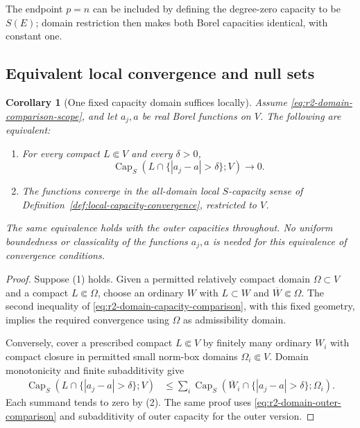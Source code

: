 \documentclass[11pt,a4paper]{article}
\numberwithin{equation}{section}
\newtheorem{corollary}[theorem]{Corollary}
\theoremstyle{definition}
\theoremstyle{remark}
\begin{document}
The endpoint $p=n$ can be included by defining the degree-zero
capacity to be $S(E)$; domain restriction then makes both Borel
capacities identical, with constant one.

\subsection{Equivalent local convergence and null sets}

\begin{corollary}[One fixed capacity domain suffices locally]
\label{cor:r2-fixed-domain-local-convergence}
Assume \eqref{eq:r2-domain-comparison-scope}, and let $a_j,a$ be
real Borel functions on $V$. The following are equivalent:
\begin{enumerate}
\item For every compact $L\Subset V$ and every $\delta>0$,
\[
 \operatorname{Cap}_S(L\cap\{|a_j-a|>\delta\};V)
                          \longrightarrow0.
\]
\item The functions converge in the all-domain local $S$-capacity
      sense of Definition~\ref{def:local-capacity-convergence},
      restricted to $V$.
\end{enumerate}
The same equivalence holds with the outer capacities throughout.
No uniform boundedness or classicality of the functions $a_j,a$ is
needed for this equivalence of convergence conditions.
\end{corollary}

\begin{proof}
Suppose (1) holds. Given a permitted relatively compact domain
$\Omega\subset V$ and a compact $L\Subset\Omega$, choose an
ordinary $W$ with $L\subset W$ and $\overline W\Subset\Omega$.
The second inequality of
\eqref{eq:r2-domain-capacity-comparison}, with this fixed geometry,
implies the required convergence using $\Omega$ as admissibility
domain.

Conversely, cover a prescribed compact $L\Subset V$ by finitely many
ordinary $W_i$ with compact closure in permitted small norm-box
domains $\Omega_i\Subset V$. Domain monotonicity and finite
subadditivity give
\[
 \begin{split}
 \operatorname{Cap}_S(L\cap\{|a_j-a|>\delta\};V)
 &\leq\sum_i\operatorname{Cap}_S
       (\overline W_i\cap\{|a_j-a|>\delta\};\Omega_i).
 \end{split}
\]
Each summand tends to zero by (2). The same proof uses
\eqref{eq:r2-domain-outer-comparison} and subadditivity of outer
capacity for the outer version.
\end{proof}
\end{document}
